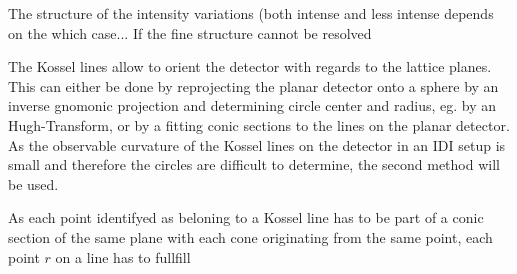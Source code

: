 The structure of the intensity variations (both intense and less intense depends on the which case...
If the fine structure cannot be resolved

The Kossel lines allow to orient the detector with regards to the lattice planes. This can either be done by reprojecting the planar detector onto a sphere by an inverse gnomonic projection and determining circle center and radius, eg. by an Hugh-Transform, or by a fitting conic sections to the lines on the planar detector. As the observable curvature of the Kossel lines on the detector in an IDI setup is small and therefore the circles are difficult to determine, the second method will be used. 

As each point identifyed as beloning to a Kossel line has to be part of a conic section of the same plane with each cone originating from the same point, each point $r$ on a line has to fullfill



